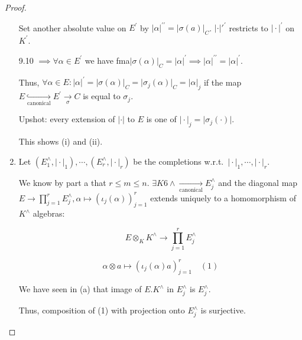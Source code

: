 \documentclass[openany]{amsbook}
\numberwithin{section}{chapter}
\theoremstyle{definition}
\begin{document}
\begin{proof}
\begin{enumerate}[label=\alph*)]
        \begin{center}
        \end{center}

        Set another absolute value on \(E^{\prime}\) by \(\vert \alpha \vert ^{\prime\prime} = \vert \sigma(a) \vert _C\). \(\vert \cdot \vert '^{\prime}\) restricts to \(\vert \cdot \vert^{\prime}\) on \(K^{\prime}\).

        9.10 \(\implies \forall \alpha \in E^{\prime}\) we have fma\(\vert \sigma(\alpha) \vert _C = \vert \alpha \vert ^{\prime} \implies \vert \alpha \vert ^{\prime\prime} = \vert \alpha \vert ^{\prime} \).
        
        Thus, \(\forall \alpha \in E: \vert \alpha \vert ^{\prime} = \vert \sigma(\alpha) \vert _C = \vert \sigma_j (\alpha) \vert _C = \vert \alpha \vert _j\) if the map \(E \underset{\text{canonical}}{\hookrightarrow} E^{\prime} \underset{\sigma}{\to} C\) is equal to \(\sigma_j\).

        Upshot: every extension of \(\vert \cdot \vert\) to \(E\) is one of \(\vert \cdot \vert_j = \vert \sigma_j(\cdot) \vert\).

        This shows (i) and (ii).

        \item Let \((E_1^\wedge, \vert \cdot \vert _1), \cdots , (E_r^\wedge, \vert \cdot \vert_r)\) be the completions w.r.t.\ \(\vert \cdot \vert_1, \cdots , \vert \cdot \vert_r\).
        
        We know by part a that \(r \leq m \leq n\). \(\exists K6\wedge \underset{\text{canonical}}{\to} E_j^\wedge\) and the diagonal map \(E \to \prod_{j=1}^r E_j^\wedge, \alpha \mapsto (\iota_j(\alpha))_{j=1}^r\) extends uniquely to a homomorphism of \(K^\wedge\) algebras:

        \[
            E \otimes_K K^\wedge \to \prod_{j=1}^r E_j^\wedge
        \]

        \[
            \alpha \otimes a \mapsto (\iota_j(\alpha)a)_{j=1}^r \quad(1)
        \]

        We have seen in (a) that image of \(E.K^\wedge\) in \(E_j^\wedge\) is \(E_j^\wedge\).
        
        Thus, composition of (1) with projection onto \(E_j^\wedge\) is surjective.


\end{enumerate}
\end{proof}
\end{document}
